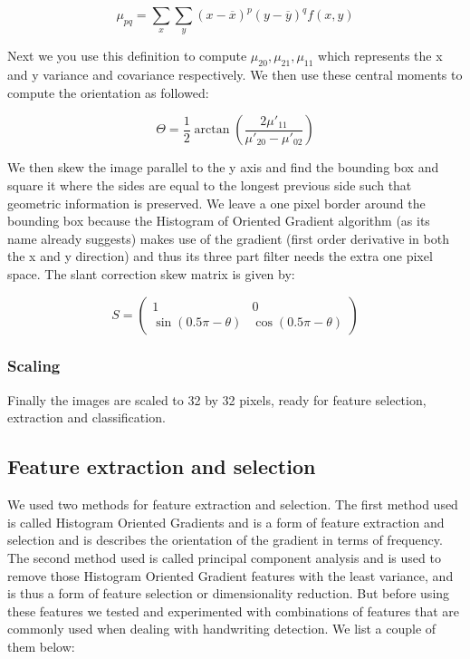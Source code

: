 \documentclass[%
        compressed,
        final,
        notitlepage,
        narroweqnarray,
        inline,
        twoside,
        ]{ieee}
\begin{document}
\begin{equation}
    \mu_{pq} = \sum_x \sum_y (x - \overline{x})^p(y - \overline{y})^q f(x, y)
\end{equation}

 
Next we you use this definition to compute $\mu_{20}, \mu_{21}, \mu_{11}$ which represents the x and y variance and covariance respectively. We then use these central moments to compute the orientation as followed:

\begin{equation}
    \Theta = \frac{1}{2} \arctan \left(
        \frac{2\mu'_{11}}{\mu'_{20} - \mu'_{02}}
    \right)
\end{equation}

We then skew the image parallel to the y axis and find the bounding box and square it where the sides are equal to the longest previous side such that geometric information is preserved. We leave a one pixel border around the bounding box because the Histogram of Oriented Gradient algorithm (as its name already suggests) makes use of the gradient (first order derivative in both the x and y direction) and thus its three part filter needs the extra one pixel space. The slant correction skew matrix is given by:

\begin{equation}
    S = \begin{pmatrix}
        1 & 0 \\
        \sin(0.5 \pi - \theta) & \cos(0.5 \pi - \theta)
    \end{pmatrix}
\end{equation}

\subsubsection{Scaling}
Finally the images are scaled to 32 by 32 pixels, ready for feature selection, extraction and classification.
\subsection{Feature extraction and selection}
We used two methods for feature extraction and selection. The first method used is called Histogram Oriented Gradients and is a form of feature extraction and selection and is describes the orientation of the gradient in terms of frequency. The second method used is called principal component analysis and is used to remove those Histogram Oriented Gradient features with the least variance, and is thus a form of feature selection or dimensionality reduction. But before using these features we tested and experimented with combinations of features that are commonly used when dealing with handwriting detection. We list a couple of them below:
\end{document}
